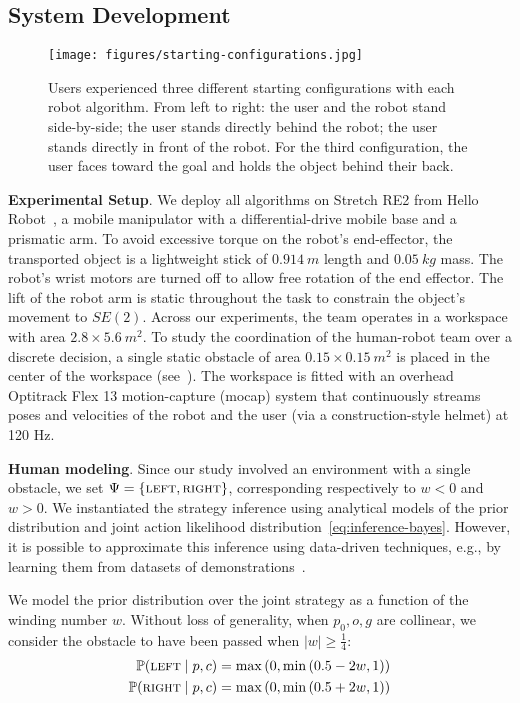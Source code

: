 \subsection{System Development}

\begin{figure}[t]
    \centering
    \texttt{[image: figures/starting-configurations.jpg]}
    \caption{Users experienced three different starting configurations with each robot algorithm. From left to right: the user and the robot stand side-by-side; the user stands directly behind the robot; the user stands directly in front of the robot. For the third configuration, the user faces toward the goal and holds the object behind their back.}
    \label{fig:exp-setup}
\end{figure}

\textbf{Experimental Setup}. We deploy all algorithms on Stretch RE2 from Hello Robot~\citep{kemp2022design}, a mobile manipulator with a differential-drive mobile base and a prismatic arm.
To avoid excessive torque on the robot's end-effector, the transported object is a lightweight stick of $0.914~m$ length and $0.05~kg$ mass.
The robot's wrist motors are turned off to allow free rotation of the end effector. The lift of the robot arm is static throughout the task to constrain the object's movement to $SE(2)$.
Across our experiments, the team operates in a workspace with area $2.8 \times 5.6~m^2$.
To study the coordination of the human-robot team over a discrete decision, a single static obstacle of area $0.15 \times 0.15~m^2$ is placed in the center of the workspace (see~). The workspace is fitted with an overhead Optitrack Flex 13 motion-capture (mocap) system that continuously streams poses and velocities of the robot and the user (via a construction-style helmet) at 120 Hz.

\textbf{Human modeling}. Since our study involved an environment with a single obstacle, we set $\Psi = \{\textsc{left}, \textsc{right}\}$, corresponding respectively to $w<0$ and $w>0$.
We instantiated the strategy inference using analytical models of the prior distribution and joint action likelihood distribution~\eqref{eq:inference-bayes}. However, it is possible to approximate this inference using data-driven techniques, e.g., by learning them from datasets of demonstrations~\citep{ng2023takes, freeman2023classification}.

We model the prior distribution over the joint strategy as a function of the winding number $w$. Without loss of generality, when $p_0, o, g$ are collinear, we consider the obstacle to have been passed when $\left|w\right| \ge \frac{1}{4}$:
\begin{equation}
\begin{split}
    \mathbb{P}(\textsc{left} \mid p, c) &= \max\left(0, \min\left(0.5 - 2w, 1\right)\right) \\
    \mathbb{P}(\textsc{right} \mid p, c) &= \max\left(0, \min\left(0.5 + 2w, 1\right)\right)
\end{split}
\end{equation}

